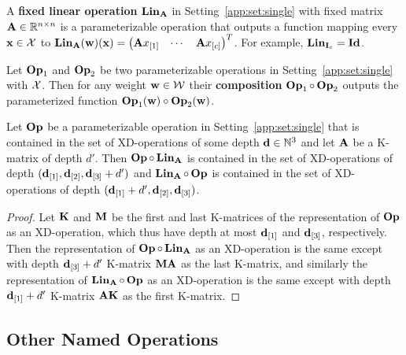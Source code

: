 \begin{Def}\label{app:def:lin}
	A {\bf fixed linear operation} $\Lin_{\*A}$ in Setting~\ref{app:set:single} with fixed matrix $\*A\in\R^{n\times n}$ is a parameterizable operation that outputs a function mapping every $\*x\in\X$ to $\Lin_{\*A}(\*w)(\*x)=\begin{pmatrix}\*Ax_{[1]}&\cdots&\*Ax_{[c]}\end{pmatrix}^T$.
	For example, $\Lin_{\*I_c}=\Id$.
\end{Def}

\begin{Def}\label{app:def:composition}
	Let $\Op_1$ and $\Op_2$ be two parameterizable operations in Setting~\ref{app:set:single} with $\X$.
	Then for any weight $\*w\in\W$ their {\bf composition} $\Op_1\circ\Op_2$ outputs the parameterized function $\Op_1(\*w)\circ\Op_2(\*w)$.
\end{Def}

\begin{Clm}\label{app:clm:composition}
	Let $\Op$ be a parameterizable operation in Setting~\ref{app:set:single} that is contained in the set of XD-operations of some depth $\*d\in\N^3$ and let $\*A$ be a K-matrix of depth $d'$.
	Then $\Op\circ\Lin_{\*A}$ is contained in the set of XD-operations of depth $(\*d_{[1]},\*d_{[2]},\*d_{[3]}+d')$ and $\Lin_{\*A}\circ\Op$ is contained in the set of XD-operations of depth $(\*d_{[1]}+d',\*d_{[2]},\*d_{[3]})$.
\end{Clm}
\begin{proof}
	Let $\*K$ and $\*M$ be the first and last K-matrices of the representation of $\Op$ as an XD-operation, which thus have depth at most $\*d_{[1]}$ and $\*d_{[3]}$, respectively.
	Then the representation of $\Op\circ\Lin_{\*A}$ as an XD-operation is the same except with depth $\*d_{[3]}+d'$ K-matrix $\*M\*A$ as the last K-matrix, and similarly the representation of $\Lin_{\*A}\circ\Op$ as an XD-operation is the same except with depth $\*d_{[1]}+d'$ K-matrix $\*A\*K$ as the first K-matrix.
\end{proof}

\subsection{Other Named Operations}


